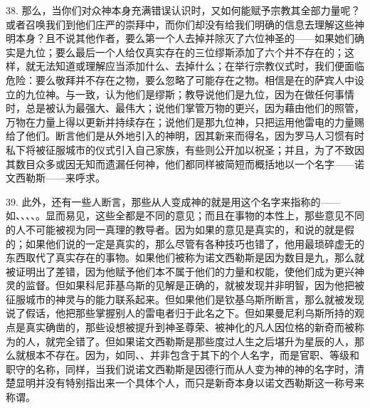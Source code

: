 38. 那么，当你们对众神本身充满错误认识时，又如何能赋予宗教其全部力量呢？或者召唤我们到他们庄严的崇拜中，而你们却没有给我们明确的信息去理解这些神明本身？且不说其他作者，要么第一个人去掉并除灭了六位神圣的——如果她们确实是九位；要么最后一个人给仅真实存在的三位缪斯添加了六个并不存在的；这样，就无法知道或理解应当添加什么、去掉什么；在举行宗教仪式时，我们便面临危险：要么敬拜并不存在之物，要么忽略了可能存在之物。相信是在的萨宾人中设立的九位神。与一致，认为他们是缪斯；教导说他们是九位，因为在做任何事情时，总是被认为最强大、最伟大；说他们掌管万物的更兴，因为藉由他们的照管，万物在力量上得以更新并持续存在；说他们是那九位神，只把运用他雷电的力量赐给了他们。断言他们是从外地引入的神明，因其新来而得名，因为罗马人习惯有时私下将被征服城市的仪式引入自己家族，有些则公开加以祝圣；并且，为了不致因其数目众多或因无知而遗漏任何神，他们都同样被简短而概括地以一个名字——诺文西勒斯——来呼求。\par

39. 此外，还有一些人断言，那些从人变成神的就是用这个名字来指称的——如、、、、。显而易见，这些全都是不同的意见；而且在事物的本性上，那些意见不同的人不可能被视为同一真理的教导者。因为如果的意见是真实的，和说的就是假的；如果他们说的一定是真实的，那么尽管有各种技巧也错了，他用最琐碎虚无的东西取代了真实存在的事物。如果他们被称为诺文西勒斯是因为数目是九，那么就被证明出了差错，因为他赋予他们本不属于他们的力量和权能，使他们成为更兴神灵的监督。但如果科尼菲基乌斯的见解是正确的，就被发现并非明智，因为他把被征服城市的神灵与的能力联系起来。但如果他们是钦基乌斯所断言，那么就被发现说了假话，他把那些掌握别人的雷电者归于此名之下。但如果曼尼利乌斯所持的观点是真实确凿的，那些设想被提升到神圣尊荣、被神化的凡人因位格的新奇而被称为的人，就完全错了。但如果诺文西勒斯是那些度过人生之后堪升为星辰的人，那么就根本不存在。因为，如同、、并非包含于其下的个人名字，而是官职、等级和职守的名称，同样，当我们说诺文西勒斯是因德行而从人变为神的神的名字时，清楚显明并没有特别指出来一个具体个人，而只是新奇本身以诺文西勒斯这一称号来称谓。\par

